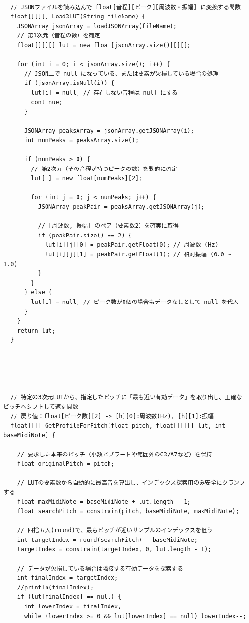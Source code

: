 \begin{lstlisting}[caption={Utils.pde}, label={lst:proc_utils}]
  
  // JSONファイルを読み込んで float[音程][ピーク][周波数・振幅] に変換する関数
  float[][][] Load3LUT(String fileName) {
    JSONArray jsonArray = loadJSONArray(fileName);
    // 第1次元（音程の数）を確定
    float[][][] lut = new float[jsonArray.size()][][];
    
    for (int i = 0; i < jsonArray.size(); i++) {
      // JSON上で null になっている、または要素が欠損している場合の処理
      if (jsonArray.isNull(i)) {
        lut[i] = null; // 存在しない音程は null にする
        continue;
      }
      
      JSONArray peaksArray = jsonArray.getJSONArray(i);
      int numPeaks = peaksArray.size();
      
      if (numPeaks > 0) {
        // 第2次元（その音程が持つピークの数）を動的に確定
        lut[i] = new float[numPeaks][2]; 
        
        for (int j = 0; j < numPeaks; j++) {
          JSONArray peakPair = peaksArray.getJSONArray(j);
          
          // [周波数, 振幅] のペア（要素数2）を確実に取得
          if (peakPair.size() == 2) {
            lut[i][j][0] = peakPair.getFloat(0); // 周波数 (Hz)
            lut[i][j][1] = peakPair.getFloat(1); // 相対振幅 (0.0 ~ 1.0)
          }
        }
      } else {
        lut[i] = null; // ピーク数が0個の場合もデータなしとして null を代入
      }
    }
    return lut;
  }
  
  
  
  
  
  // 特定の3次元LUTから、指定したピッチに「最も近い有効データ」を取り出し、正確なピッチへシフトして返す関数
  // 戻り値：float[ピーク数][2] -> [h][0]:周波数(Hz), [h][1]:振幅
  float[][] GetProfileForPitch(float pitch, float[][][] lut, int baseMidiNote) {
    
    // 要求した本来のピッチ（小数ビブラートや範囲外のC3/A7など）を保持
    float originalPitch = pitch;
    
    // LUTの要素数から自動的に最高音を算出し、インデックス探索用のみ安全にクランプする
    float maxMidiNote = baseMidiNote + lut.length - 1;
    float searchPitch = constrain(pitch, baseMidiNote, maxMidiNote);
    
    // 四捨五入(round)で、最もピッチが近いサンプルのインデックスを狙う
    int targetIndex = round(searchPitch) - baseMidiNote;
    targetIndex = constrain(targetIndex, 0, lut.length - 1);
    
    // データが欠損している場合は隣接する有効データを探索する
    int finalIndex = targetIndex;
    //println(finalIndex);
    if (lut[finalIndex] == null) {
      int lowerIndex = finalIndex;
      while (lowerIndex >= 0 && lut[lowerIndex] == null) lowerIndex--;
      

\end{lstlisting}
